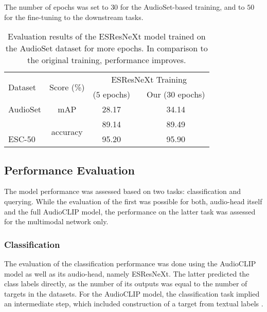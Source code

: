 \documentclass[runningheads]{llncs}
\newcommand{\ra}[1]{\renewcommand{\arraystretch}{#1}}
\begin{document}
The number of epochs was set to $30$ for the \mbox{AudioSet}-based training, and to $50$ for the fine-tuning to the downstream tasks.

\begin{table}[tbp]
\begin{threeparttable}[t]
\caption{Evaluation results of the \mbox{ESResNeXt} model trained on the \mbox{AudioSet} dataset for more epochs. In comparison to the original training, performance improves.}
\label{tbl:clf:esrnx}
\ra{1.0}
\begin{tabularx}{\linewidth}{lXccc}
\toprule
\multicolumn{1}{l}{\multirow{2}{*}{Dataset}} & \multicolumn{1}{c}{\multirow{2}{*}{Score (\%)}} & \multicolumn{3}{c}{ESResNeXt Training} \\
\cmidrule{3-5}
 & & \multicolumn{1}{c}{\cite{guzhov2021esrnx} ($5$ epochs)} & \multicolumn{1}{c}{\qquad\qquad} & \multicolumn{1}{c}{Our ($30$ epochs)} \\
\midrule
\multicolumn{1}{l}{AudioSet} & \multicolumn{1}{c}{mAP} & \multicolumn{1}{c}{28.17} & & \multicolumn{1}{c}{34.14} \\
\addlinespace[0.5em]
\multicolumn{1}{l}{UrbanSound8K} & \multicolumn{1}{c}{\multirow{2}{*}{accuracy}} & \multicolumn{1}{c}{89.14} & & \multicolumn{1}{c}{89.49} \\
\multicolumn{1}{l}{ESC-50} & & \multicolumn{1}{c}{95.20} & & \multicolumn{1}{c}{95.90} \\
\bottomrule
\end{tabularx}
\end{threeparttable}
\end{table}

\subsection{Performance Evaluation} \label{sec:exp_setup:infer}
The model performance was assessed based on two tasks: classification and querying.
While the evaluation of the first was possible for both, audio-head itself and the full \mbox{AudioCLIP} model, the performance on the latter task was assessed for the multimodal network only.

\subsubsection{Classification} \label{sec:exp_setup:infer:clf}
The evaluation of the classification performance was done using the \mbox{AudioCLIP} model as well as its audio-head, namely \mbox{ESResNeXt}.
The latter predicted the class labels directly, as the number of its outputs was equal to the number of targets in the datasets.
For the \mbox{AudioCLIP} model, the classification task implied an intermediate step, which included construction of a target from textual labels \cite{radford2021clip}.
\end{document}
